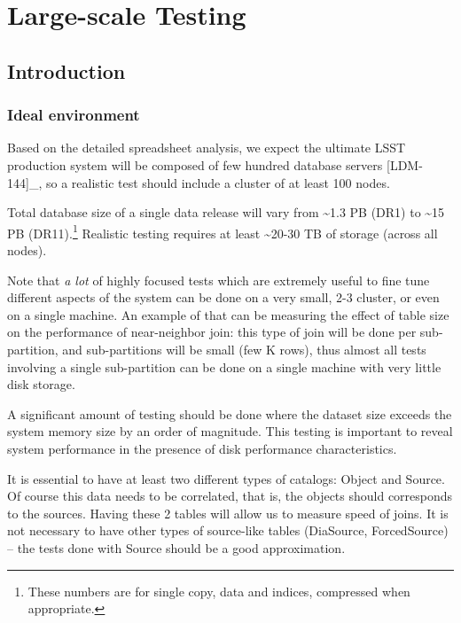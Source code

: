 \documentclass[DM,lsstdraft,toc]{lsstdoc}
\begin{document}
\section{Large-scale Testing}\label{large-scale-testing}

\subsection{Introduction}\label{introduction-1}

\subsubsection{Ideal environment}\label{ideal-environment}

Based on the detailed spreadsheet analysis, we expect the ultimate LSST
production system will be composed of few hundred database servers
{[}LDM-144{]}\_, so a realistic test should include a cluster of at
least 100 nodes.

Total database size of a single data release will vary from
\textasciitilde{}1.3 PB (DR1) to \textasciitilde{}15 PB
(DR11).\footnote{These numbers are for single copy, data and indices,
  compressed when appropriate.} Realistic testing requires at least
\textasciitilde{}20-30 TB of storage (across all nodes).

Note that \emph{a lot} of highly focused tests which are extremely
useful to fine tune different aspects of the system can be done on a
very small, 2-3 cluster, or even on a single machine. An example of that
can be measuring the effect of table size on the performance of
near-neighbor join: this type of join will be done per sub-partition,
and sub-partitions will be small (few K rows), thus almost all tests
involving a single sub-partition can be done on a single machine with
very little disk storage.

A significant amount of testing should be done where the dataset size
exceeds the system memory size by an order of magnitude. This testing is
important to reveal system performance in the presence of disk
performance characteristics.

It is essential to have at least two different types of catalogs: Object
and Source. Of course this data needs to be correlated, that is, the
objects should corresponds to the sources. Having these 2 tables will
allow us to measure speed of joins. It is not necessary to have other
types of source-like tables (DiaSource, ForcedSource) -- the tests done
with Source should be a good approximation.
\end{document}
